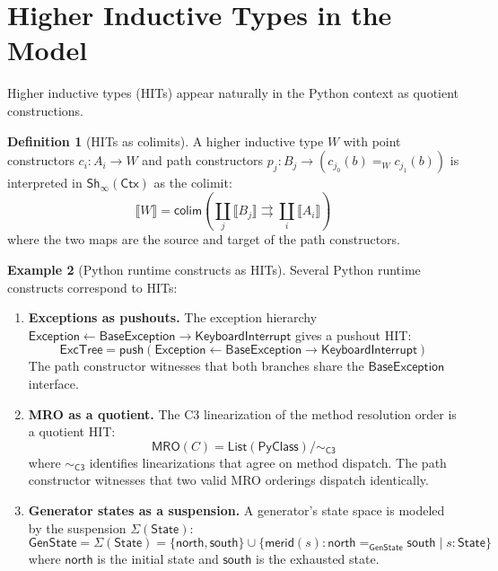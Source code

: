 \documentclass[11pt,a4paper]{report}
\theoremstyle{definition}
\newtheorem{definition}{Definition}[chapter]
\newtheorem{example}[definition]{Example}
\theoremstyle{plain}
\newcommand{\den}[1]{\llbracket #1 \rrbracket}
\newcommand{\PyClass}{\mathsf{PyClass}}
\newcommand{\Ctx}{\mathsf{Ctx}}
\newcommand{\MRO}{\mathsf{MRO}}
\newcommand{\Sh}{\mathsf{Sh}}
\begin{document}
\section{Higher Inductive Types in the Model}

Higher inductive types (HITs) appear naturally in the Python context as quotient
constructions.

\begin{definition}[HITs as colimits]
\label{def:hits-model}
A higher inductive type $W$ with point constructors $c_i : A_i \to W$ and
path constructors $p_j : B_j \to (c_{j_0}(b) =_W c_{j_1}(b))$ is interpreted
in $\Sh_\infty(\Ctx)$ as the colimit:
\[
  \den{W} = \mathsf{colim}\!\left(
    \coprod_j \den{B_j} \rightrightarrows \coprod_i \den{A_i}
  \right)
\]
where the two maps are the source and target of the path constructors.
\end{definition}

\begin{example}[Python runtime constructs as HITs]
\label{ex:python-hits}
Several Python runtime constructs correspond to HITs:
\begin{enumerate}
  \item \textbf{Exceptions as pushouts.}  The exception hierarchy
    $\mathsf{Exception} \leftarrow \mathsf{BaseException} \to \mathsf{KeyboardInterrupt}$
    gives a pushout HIT:
    \[
      \mathsf{ExcTree} = \mathsf{push}\!\left(
        \mathsf{Exception} \leftarrow \mathsf{BaseException} \to \mathsf{KeyboardInterrupt}
      \right)
    \]
    The path constructor witnesses that both branches share the
    $\mathsf{BaseException}$ interface.

  \item \textbf{MRO as a quotient.}  The C3 linearization of the method resolution
    order is a quotient HIT:
    \[
      \MRO(C) = \mathsf{List}(\PyClass) / {\sim_{\mathsf{C3}}}
    \]
    where $\sim_{\mathsf{C3}}$ identifies linearizations that agree on method
    dispatch.  The path constructor witnesses that two valid MRO orderings
    dispatch identically.

  \item \textbf{Generator states as a suspension.}  A generator's state space is
    modeled by the suspension $\Sigma(\mathsf{State})$:
    \[
      \mathsf{GenState} = \Sigma(\mathsf{State}) = \{
        \mathsf{north}, \mathsf{south}
      \} \cup \{\mathsf{merid}(s) : \mathsf{north} =_{\mathsf{GenState}} \mathsf{south}
        \mid s : \mathsf{State}\}
    \]
    where $\mathsf{north}$ is the initial state and $\mathsf{south}$ is the
    exhausted state.
\end{enumerate}
\end{example}
\end{document}
